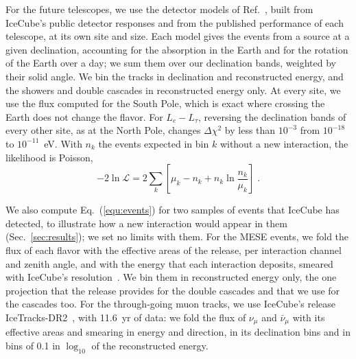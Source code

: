 \documentclass[linenumbers, aps, prd, twocolumn, superscriptaddress, floatfix, longbibliography, nofootinbib, bibnotes]{revtex4-2}
\begin{document}
For the future telescopes, we use the detector models of Ref.~\cite{Bustamante:2026inprep}, built from IceCube's public detector responses and from the published performance of each telescope, at its own site and size.
Each model gives the events from a source at a given declination, accounting for the absorption in the Earth and for the rotation of the Earth over a day; we sum them over our declination bands, weighted by their solid angle.
We bin the tracks in declination and reconstructed energy, and the showers and double cascades in reconstructed energy only.
At every site, we use the flux computed for the South Pole, which is exact where crossing the Earth does not change the flavor.
For $L_e - L_\tau$, reversing the declination bands of every other site, as at the North Pole, changes $\Delta\chi^2$ by less than $10^{-3}$ from $10^{-18}$ to $10^{-11}$~eV.
With $n_k$ the events expected in bin $k$ without a new interaction, the likelihood is Poisson,
\begin{equation}
 \label{equ:likelihood}
 -2\ln\mathcal{L} = 2 \sum_k \left[ \mu_k - n_k + n_k \ln\frac{n_k}{\mu_k} \right] \;.
\end{equation}

We also compute Eq.~(\ref{equ:events}) for two samples of events that IceCube has detected, to illustrate how a new interaction would appear in them (Sec.~\ref{sec:results}); we set no limits with them.
For the MESE events, we fold the flux of each flavor with the effective areas of the release, per interaction channel and zenith angle, and with the energy that each interaction deposits, smeared with IceCube's resolution~\cite{Bustamante:2026inprep}.
We bin them in reconstructed energy only, the one projection that the release provides for the double cascades and that we use for the cascades too.
For the through-going muon tracks, we use IceCube's release IceTracks-DR2~\cite{IceCube:IceTracksDR2}, with 11.6~yr of data: we fold the flux of $\nu_\mu$ and $\bar\nu_\mu$ with its effective areas and smearing in energy and direction, in its declination bins and in bins of 0.1 in $\log_{10}$ of the reconstructed energy.
\end{document}
